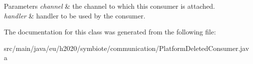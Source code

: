 \begin{DoxyParams}{Parameters}
{\em channel} & the channel to which this consumer is attached. \\
\hline
{\em handler} & handler to be used by the consumer. \\
\hline
\end{DoxyParams}


The documentation for this class was generated from the following file\+:\begin{DoxyCompactItemize}
\item 
src/main/java/eu/h2020/symbiote/communication/Platform\+Deleted\+Consumer.\+java\end{DoxyCompactItemize}
